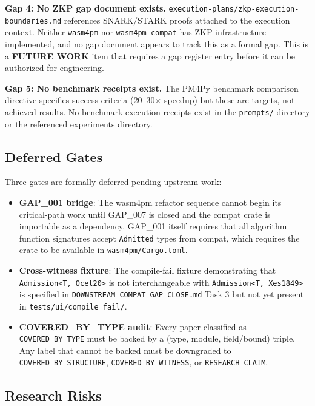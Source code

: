\textbf{Gap 4: No ZKP gap document exists.}
\texttt{execution-plans/zkp-execution-boundaries.md} references SNARK/STARK proofs
attached to the execution context. Neither \texttt{wasm4pm} nor \texttt{wasm4pm-compat}
has ZKP infrastructure implemented, and no gap document appears to track this as a
formal gap. This is a \textbf{FUTURE WORK} item that requires a gap register entry
before it can be authorized for engineering.

\textbf{Gap 5: No benchmark receipts exist.}
The PM4Py benchmark comparison directive specifies success criteria (20--30$\times$
speedup) but these are targets, not achieved results. No benchmark execution receipts
exist in the \texttt{prompts/} directory or the referenced experiments directory.

\subsection{Deferred Gates}
\label{sec:prompts-open-questions-deferred}

Three gates are formally deferred pending upstream work:

\begin{itemize}
  \item \textbf{GAP\_001 bridge}: The wasm4pm refactor sequence cannot begin its
    critical-path work until GAP\_007 is closed and the compat crate is importable
    as a dependency. GAP\_001 itself requires that all algorithm function signatures
    accept \texttt{Admitted} types from compat, which requires the crate to be
    available in \texttt{wasm4pm/Cargo.toml}.
  \item \textbf{Cross-witness fixture}: The compile-fail fixture demonstrating that
    \texttt{Admission<T, Ocel20>} is not interchangeable with
    \texttt{Admission<T, Xes1849>} is specified in \texttt{DOWNSTREAM\_COMPAT\_GAP\_CLOSE.md}
    Task 3 but not yet present in \texttt{tests/ui/compile\_fail/}.
  \item \textbf{COVERED\_BY\_TYPE audit}: Every paper classified as
    \texttt{COVERED\_BY\_TYPE} must be backed by a (type, module, field/bound) triple.
    Any label that cannot be backed must be downgraded to \texttt{COVERED\_BY\_STRUCTURE},
    \texttt{COVERED\_BY\_WITNESS}, or \texttt{RESEARCH\_CLAIM}.
\end{itemize}

\subsection{Research Risks}
\label{sec:prompts-open-questions-risks}

